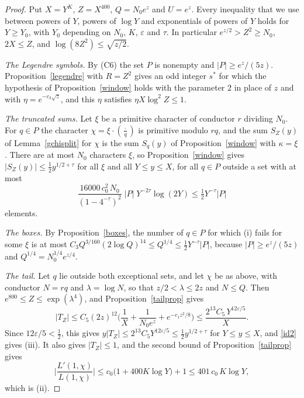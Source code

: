 \begin{proof}
Put $X=Y^K$, $Z=X^{400}$, $Q=N_0e^z$ and $U=e^z$. Every inequality that we use between powers of $Y$, powers of $\log Y$ and exponentials of powers of $Y$ holds for $Y\ge Y_0$, with $Y_0$ depending on $N_0$, $K$, $\varepsilon$ and $\tau$. In particular $e^{z/2}>Z^2\ge N_0$, $2X\le Z$, and $\log(8Z^2)\le\sqrt{z/2}$.

\emph{The Legendre symbols.} By (C6) the set $P$ is nonempty and $\lvert P\rvert\ge e^z/(5z)$. Proposition~\ref{legendre} with $R=Z^2$ gives an odd integer $s^\ast$ for which the hypothesis of Proposition~\ref{window} holds with the parameter $2$ in place of $z$ and with $\eta=e^{-c_3\sqrt z}$, and this $\eta$ satisfies $\eta X\log^2Z\le1$.

\emph{The truncated sums.} Let $\xi$ be a primitive character of conductor $r$ dividing $N_0$. For $q\in P$ the character $\chi=\xi\cdot(\frac{\cdot}{q})$ is primitive modulo $rq$, and the sum $S_Z(y)$ of Lemma~\ref{gchisplit} for $\chi$ is the sum $S_q(y)$ of Proposition~\ref{window} with $\kappa=\xi$. There are at most $N_0$ characters $\xi$, so Proposition~\ref{window} gives $\lvert S_Z(y)\rvert\le\frac12y^{1/2+\tau}$ for all $\xi$ and all $Y\le y\le X$, for all $q\in P$ outside a set with at most
\[
\frac{16000\,c_0^2\,N_0}{(1-4^{-\tau})^2}\;\lvert P\rvert\;Y^{-2\tau}\log(2Y)\le\tfrac12Y^{-\tau}\lvert P\rvert
\]
elements.

\emph{The boxes.} By Proposition~\ref{boxes}, the number of $q\in P$ for which (i) fails for some $\xi$ is at most $C_3Q^{3/160}(2\log Q)^{14}\le Q^{1/4}\le\frac12Y^{-\tau}\lvert P\rvert$, because $\lvert P\rvert\ge e^z/(5z)$ and $Q^{1/4}=N_0^{1/4}e^{z/4}$.

\emph{The tail.} Let $q$ lie outside both exceptional sets, and let $\chi$ be as above, with conductor $N=rq$ and $\lambda=\log N$, so that $z/2<\lambda\le2z$ and $N\le Q$. Then $e^{800}\le Z\le\exp(\lambda^4)$, and Proposition~\ref{tailprop} gives
\[
\lvert T_Z\rvert\le C_5(2z)^{12}\Big(\frac1X+\frac1{N_0e^z}+e^{-c_1z^2/8}\Big)\le\frac{2^{13}C_5\,Y^{12\varepsilon/5}}X .
\]
Since $12\varepsilon/5<\frac12$, this gives $y\lvert T_Z\rvert\le2^{13}C_5Y^{12\varepsilon/5}\le\frac12y^{1/2+\tau}$ for $Y\le y\le X$, and \eqref{id2} gives (iii). It also gives $\lvert T_Z\rvert\le1$, and the second bound of Proposition~\ref{tailprop} gives
\[
\Big\lvert\frac{L'(1,\chi)}{L(1,\chi)}\Big\rvert\le c_0\big(1+400K\log Y\big)+1\le401\,c_0\,K\log Y ,
\]
which is (ii).
\end{proof}

